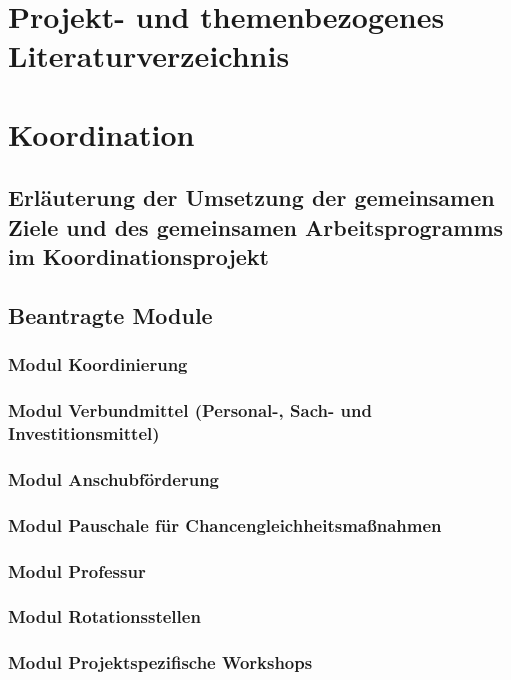 \documentclass{scrartcl}
\begin{document}
\section{Projekt- und themenbezogenes Literaturverzeichnis}
\printbibliography[heading=none]


\section{Koordination}

\subsection{Erläuterung der Umsetzung der gemeinsamen Ziele und des gemeinsamen Arbeitsprogramms im Koordinationsprojekt}

\subsection{Beantragte Module}

\subsubsection{Modul Koordinierung}

\subsubsection{Modul Verbundmittel (Personal-, Sach- und Investitionsmittel)}

\subsubsection{Modul Anschubförderung}

\subsubsection{Modul Pauschale für Chancengleichheitsmaßnahmen}

\subsubsection{Modul Professur}

\subsubsection{Modul Rotationsstellen}

\subsubsection{Modul Projektspezifische Workshops}
\end{document}
